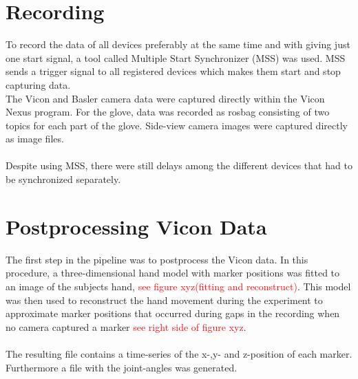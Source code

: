 \section{Recording}
To record the data of all devices preferably at the same time and with giving just one start signal, a tool called Multiple Start Synchronizer (MSS) was used. MSS sends a trigger signal to all registered devices which makes them start and stop capturing data.\\
The Vicon and Basler camera data were captured directly within the Vicon Nexus program. For the glove, data was recorded as rosbag consisting of two topics for each part of the glove. Side-view camera images were captured directly as image files.\\
\\
Despite using MSS, there were still delays among the different devices that had to be synchronized separately. 
\section{Postprocessing Vicon Data}
The first step in the pipeline was to postprocess the Vicon data. In this procedure, a three-dimensional hand model with marker positions was fitted to an image of the subjects hand, \textcolor{red}{see figure xyz(fitting and reconstruct)}. This model was then used to reconstruct the hand movement during the experiment to approximate marker positions that occurred during gaps in the recording when no camera captured a marker \textcolor{red}{see right side of figure xyz}.\\
\\
The resulting file contains a time-series of the x-,y- and z-position of each marker. Furthermore a file with the joint-angles was generated.
